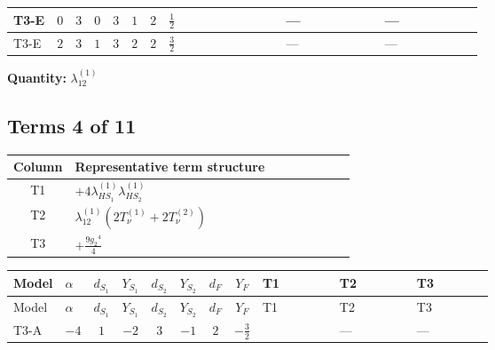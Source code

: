 \documentclass[8pt]{article}
\begin{document}
\begin{landscape}
\begin{longtable}{@{}llcccccc >{\raggedright\arraybackslash}p{0.21\linewidth} >{\raggedright\arraybackslash}p{0.21\linewidth} >{\raggedright\arraybackslash}p{0.21\linewidth}@{}}
\midrule
T3-E & $0$ & $3$ & $0$ & $3$ & $1$ & $2$ & $\frac{1}{2}$ & \scriptsize\adjustbox{max width=\linewidth}{$\begin{gathered} +4 {\lambda_{12}^{(1)}}^2\end{gathered}$} & --- & --- \\
\midrule
T3-E & $2$ & $3$ & $1$ & $3$ & $2$ & $2$ & $\frac{3}{2}$ & \scriptsize\adjustbox{max width=\linewidth}{$\begin{gathered} +4 {\lambda_{12}^{(1)}}^2\end{gathered}$} & --- & --- \\
\midrule
\bottomrule
\end{longtable}
\clearpage
\noindent\textbf{Quantity: }$\lambda_{12}^{(1)}$\par\smallskip
\subsection*{Terms 4 of 11}
\begin{center}
\begin{tabular}{@{}c >{\raggedright\arraybackslash}p{0.82\linewidth}@{}}
\toprule
Column & Representative term structure \\
\midrule
T1 & \(\displaystyle +4 {\lambda_{HS_1}^{(1)}} {\lambda_{HS_2}^{(1)}}\) \\
\midrule
T2 & \(\displaystyle {\lambda_{12}^{(1)}} (2 T_{\nu}^{(1)}+2 T_{\nu}^{(2)})\) \\
\midrule
T3 & \(\displaystyle +\frac{9 {g_2}^4}{4}\) \\
\midrule
\bottomrule
\end{tabular}
\end{center}
\smallskip
\tiny
\begin{longtable}{@{}llcccccc >{\raggedright\arraybackslash}p{0.21\linewidth} >{\raggedright\arraybackslash}p{0.21\linewidth} >{\raggedright\arraybackslash}p{0.21\linewidth}@{}}
\toprule
Model & $\alpha$ & $d_{S_1}$ & $Y_{S_1}$ & $d_{S_2}$ & $Y_{S_2}$ & $d_F$ & $Y_F$ & T1 & T2 & T3 \\
\midrule
\endfirsthead
\toprule
Model & $\alpha$ & $d_{S_1}$ & $Y_{S_1}$ & $d_{S_2}$ & $Y_{S_2}$ & $d_F$ & $Y_F$ & T1 & T2 & T3 \\
\midrule
\endhead
T3-A & $-4$ & $1$ & $-2$ & $3$ & $-1$ & $2$ & $-\frac{3}{2}$ & \scriptsize\adjustbox{max width=\linewidth}{$\begin{gathered} +4 {\lambda_{HS_1}^{(1)}} {\lambda_{HS_2}^{(1)}}\end{gathered}$} & --- & --- \\

\end{longtable}
\end{landscape}
\end{document}
